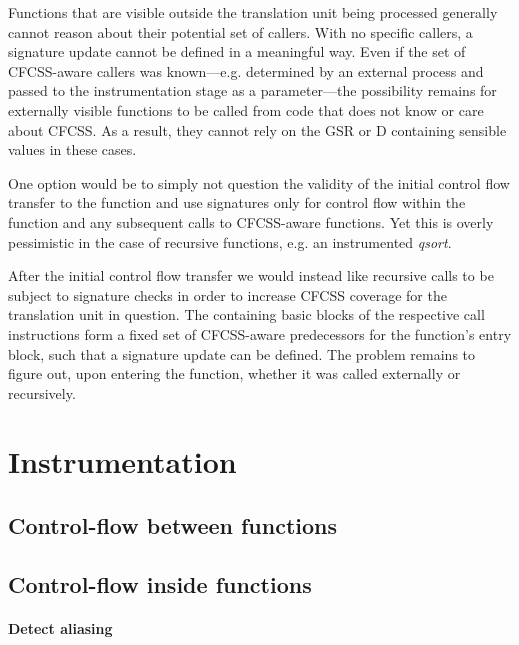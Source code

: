Functions that are visible outside the translation unit being processed
generally cannot reason about their potential set of callers. With no specific
callers, a signature update cannot be defined in a meaningful way. Even if the
set of CFCSS-aware callers was known—e.g. determined by an external
process and passed to the instrumentation stage as a parameter—the possibility
remains for externally visible functions to be called from code that does not
know or care about CFCSS. As a result, they cannot rely on the GSR or
D containing sensible values in these cases.

One option would be to simply not question the validity of the initial control
flow transfer to the function and use signatures only for control flow within
the function and any subsequent calls to CFCSS-aware functions. Yet this is
overly pessimistic in the case of recursive functions, e.g. an instrumented
\emph{qsort}.

After the initial control flow transfer we would instead like recursive calls
to be subject to signature checks in order to increase CFCSS coverage for the
translation unit in question. The containing basic blocks of the respective
call instructions form a fixed set of CFCSS-aware predecessors for the
function's entry block, such that a signature update can be defined. The
problem remains to figure out, upon entering the function, whether it was
called externally or recursively.



\section{Instrumentation}


\subsection{Control-flow between functions}


\subsection{Control-flow inside functions}


\paragraph{Detect aliasing}

